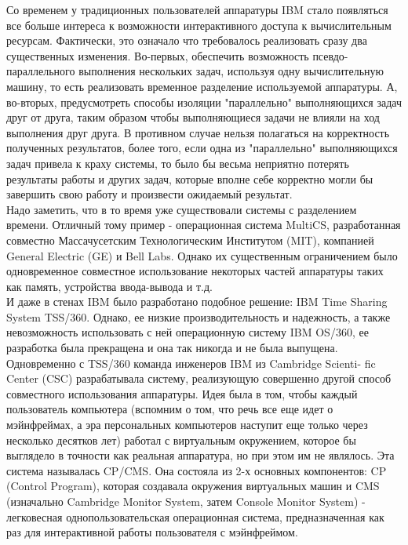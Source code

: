\documentclass[14pt, a4paper]{article}
\begin{document}
Со временем у традиционных пользователей аппаратуры IBM стало появляться все
больше интереса к возможности интерактивного доступа к вычислительным ресурсам.
Фактически, это означало что требовалось реализовать сразу два существенных
изменения. Во-первых, обеспечить возможность псевдо-параллельного выполнения
нескольких задач, используя одну вычислительную машину, то есть реализовать
временное разделение используемой аппаратуры. А, во-вторых, предусмотреть
способы изоляции "параллельно" выполняющихся задач друг от друга, таким образом
чтобы выполняющиеся задачи не влияли на ход выполнения друг друга. В противном
случае нельзя полагаться на корректность полученных результатов, более того, если
одна из "параллельно" выполняющихся задач привела к краху системы, то было бы
весьма неприятно потерять результаты работы и других задач, которые вполне себе
корректно могли бы завершить свою работу и произвести ожидаемый результат.\\

Надо заметить, что в то время уже существовали системы с разделением времени.
Отличный тому пример - операционная система MultiCS, разработанная совместно
Массачусетским Технологическим Институтом (MIT), компанией General Electric (GE) и Bell Labs. Однако их существенным ограничением было одновременное совместное
использование некоторых частей аппаратуры таких как память, устройства
ввода-вывода и т.д.\\

И даже в стенах IBM было разработано подобное решение: IBM Time Sharing System
TSS/360. Однако, ее низкие производительность и надежность, а также невозможность
использовать с ней операционную систему IBM OS/360, ее разработка была
прекращена и она так никогда и не была выпущена.\\

Одновременно с TSS/360 команда инженеров IBM из Cambridge Scienti- fic Center (CSC)
разрабатывала систему, реализующую совершенно другой способ совместного
использования аппаратуры. Идея была в том, чтобы каждый пользователь компьютера
(вспомним о том, что речь все еще идет о мэйнфреймах, а эра персональных
компьютеров наступит еще только через несколько десятков лет) работал с
виртуальным окружением, которое бы выглядело в точности как реальная аппаратура,
но при этом им не являлось. Эта система называлась CP/CMS. Она состояла из 2-х
основных компонентов: CP (Control Program), которая создавала окружения
виртуальных машин и CMS (изначально Cambridge Monitor System, затем Console
Monitor System) - легковесная однопользовательская операционная система,
предназначенная как раз для интерактивной работы пользователя с мэйнфреймом.\\
\end{document}
